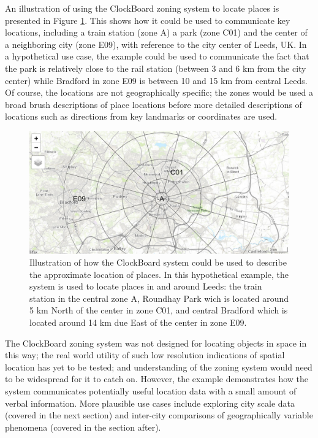 \documentclass{josis}
\begin{document}
An illustration of using the ClockBoard zoning system to locate places is presented in Figure \ref{fig:location}.
This shows how it could be used to communicate key locations, including a train station (zone A) a park (zone C01) and the center of a neighboring city (zone E09), with reference to the city center of Leeds, UK.
In a hypothetical use case, the example could be used to communicate the fact that the park is relatively close to the rail station (between 3 and 6 km from the city center) while Bradford in zone E09 is between 10 and 15 km from central Leeds.
Of course, the locations are not geographically specific; the zones would be used a broad brush descriptions of place locations before more detailed descriptions of locations such as directions from key landmarks or coordinates are used.

\begin{figure}

{\centering \includegraphics[width=0.85\linewidth]{navigation} 

}

\caption{Illustration of how the ClockBoard system could be used to describe the approximate location of places. In this hypothetical example, the system is used to locate places in and around Leeds: the train station in the central zone A, Roundhay Park wich is located around 5 km North of the center in zone C01, and central Bradford which is located around 14 km due East of the center in zone E09.}\label{fig:location}
\end{figure}

The ClockBoard zoning system was not designed for locating objects in space in this way; the real world utility of such low resolution indications of spatial location has yet to be tested; and understanding of the zoning system would need to be widespread for it to catch on.
However, the example demonstrates how the system communicates potentially useful location data with a small amount of verbal information.
More plausible use cases include exploring city scale data (covered in the next section) and inter-city comparisons of geographically variable phenomena (covered in the section after).
\end{document}
